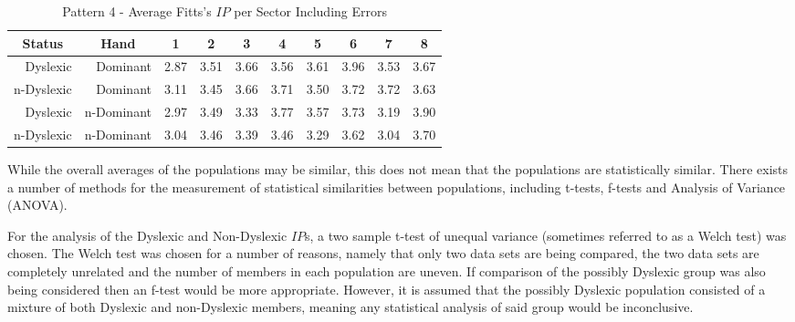 	\begin{table}[h]
		\centering
		\caption{Pattern 4 - Average Fitts's \(IP\) per Sector Including Errors}
		\label{tab_pat_4_ip_all}
		\begin{tabularx}{\textwidth}{|r|r|X|X|X|X|X|X|X|X|}
			\hline
			\multicolumn{1}{|c|}{\textbf{Status}} & \multicolumn{1}{c|}{\textbf{Hand}} & \multicolumn{1}{c|}{\textbf{1}} & \multicolumn{1}{c|}{\textbf{2}} & \multicolumn{1}{c|}{\textbf{3}} & \multicolumn{1}{c|}{\textbf{4}} & \multicolumn{1}{c|}{\textbf{5}} & \multicolumn{1}{c|}{\textbf{6}} & \multicolumn{1}{c|}{\textbf{7}} & \multicolumn{1}{c|}{\textbf{8}} \\ \hline
			Dyslexic                              & Dominant                           & 2.87       & 3.51       & 3.66       & 3.56       & 3.61       & 3.96       & 3.53       & 3.67       \\ \hline
			n-Dyslexic                          & Dominant                           & 3.11       & 3.45       & 3.66       & 3.71       & 3.50       & 3.72       & 3.72       & 3.63       \\ \hline
			Dyslexic                              & n-Dominant                       & 2.97       & 3.49       & 3.33       & 3.77       & 3.57       & 3.73       & 3.19       & 3.90       \\ \hline
			n-Dyslexic                          & n-Dominant                       & 3.04       & 3.46       & 3.39       & 3.46       & 3.29       & 3.62       & 3.04       & 3.70       \\ \hline
		\end{tabularx}
	\end{table}

		While the overall averages of the populations may be similar, this does not mean that the populations are statistically similar. There exists a number of methods for the measurement of statistical similarities between populations, including t-tests, f-tests and Analysis of Variance (ANOVA).

		For the analysis of the Dyslexic and Non-Dyslexic \(IP\)s, a two sample t-test of unequal variance (sometimes referred to as a Welch test)  was chosen. The Welch test was chosen for a number of reasons, namely that only two data sets are being compared, the two data sets are completely unrelated and the number of members in each population are uneven. If comparison of the possibly Dyslexic group was also being considered then an f-test would be more appropriate. However, it is assumed that the possibly Dyslexic population consisted of a mixture of both Dyslexic and non-Dyslexic members, meaning any statistical analysis of said group would be inconclusive.


